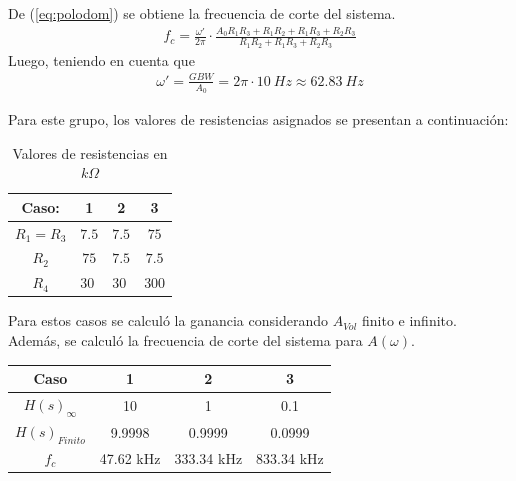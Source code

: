 De (\ref{eq:polodom}) se obtiene la frecuencia de corte del sistema.
\begin{align}
f_c=\frac{\omega'}{2\pi} \cdot \frac{A_0R_1R_3+R_1R_2+R_1R_3+R_2R_3}{R_1R_2+R_1R_3+R_2R_3}
\end{align}
Luego, teniendo en cuenta que
\begin{align}
\omega'=\frac{GBW}{A_0} = 2 \pi\cdot 10 \ Hz \approx 62.83 \ Hz
\end{align}

Para este grupo, los valores de resistencias asignados se presentan a continuación:
\begin{table}[H]
\begin{center}
\begin{tabular}{|c|c|c|c|}
\hline
\textbf{Caso:}              & \textbf{1}               & \textbf{2}               & \textbf{3}                \\ \hline
$R_1=R_3$                   & $7.5$                      & $7.5$                      & $75$                       \\ \hline
$R_2$                       & $75$                       & $7.5$                      & $7.5$                       \\ \hline
\multicolumn{1}{|c|}{$R_4$} & \multicolumn{1}{l|}{$30$} & \multicolumn{1}{l|}{$30$} & \multicolumn{1}{l|}{$300$} \\ \hline
\end{tabular}
\caption{Valores de resistencias en $k\Omega$}
\label{tabla:resasignadas}
\end{center}
\end{table}

Para estos casos se calculó la ganancia considerando $A_{Vol}$ finito e infinito. Además, se calculó la frecuencia de corte del sistema para $A(\omega)$.

\begin{table}[H]
\begin{center}
\begin{tabular}{|c|c|c|c|}
\hline
\textbf{Caso}            & \textbf{1} & \textbf{2} & \textbf{3} \\ \hline
\textbf{$H(s)_{\infty}$} & 10         & 1          & 0.1        \\ \hline
\textbf{$H(s)_{Finito}$} & 9.9998     & 0.9999     & 0.0999     \\ \hline
\textbf{$f_c$}           & 47.62 kHz   & 333.34 kHz  & 833.34 kHz     \\ \hline
\end{tabular}
\end{center}
\end{table}


